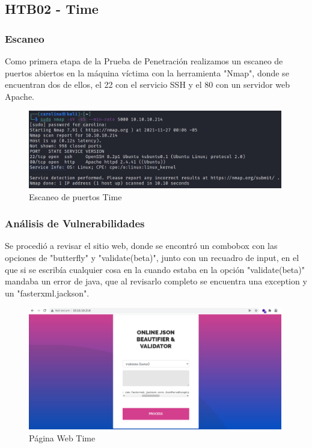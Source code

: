 \subsection{HTB02 - Time}

    \subsubsection{Escaneo}
        \large{Como primera etapa de la Prueba de Penetración realizamos un escaneo de puertos abiertos en la máquina víctima con la herramienta "Nmap", donde se encuentran dos de ellos, el 22 con el servicio SSH y el 80 con un servidor web Apache.}
        \par
        \begin{figure}[H]
            \centering
            \includegraphics[width=0.99\textwidth]{imagenes/time/01_nmap_time.png} 
            \caption{Escaneo de puertos Time} 
        \end{figure}

    \subsubsection{Análisis de Vulnerabilidades}
    
        \large{Se procedió a revisar el sitio web, donde se encontró un combobox con las opciones de "butterfly" y "validate(beta)", junto con un recuadro de input, en el que si se escribía cualquier cosa en la cuando estaba en la opción "validate(beta)" mandaba un error de java, que al revisarlo completo se encuentra una exception y un "fasterxml.jackson".}
        \par
        \begin{figure}[H]
            \centering
            \includegraphics[width=0.99\textwidth]{imagenes/time/02_web_beta_time.png}
            \caption{Página Web Time}
        \end{figure}

